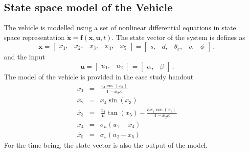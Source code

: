 \subsection*{State space model of the Vehicle}
The vehicle is modelled using a set of nonlinear differential equations in state space representation $\mathbf{\dot{x}} = \mathbf{f}(\mathbf{x}, \mathbf{u}, t)$.
The state vector of the system is defines as
\begin{equation}
	\mathbf{x} = \begin{bmatrix}
		x_1, &x_2, &x_3, &x_4, &x_5
	\end{bmatrix} = \begin{bmatrix}
		s, &d, &\theta_e, &v, &\phi
	\end{bmatrix}\, ,
\end{equation}
and the input
\begin{equation}
	\mathbf{u} = \begin{bmatrix}
		u_1, &u_2	
	\end{bmatrix} = \begin{bmatrix}
		\alpha, &\beta
	\end{bmatrix}\, .
\end{equation}
The model of the vehicle is provided in the case study handout
\begin{eqnarray}
	\dot{x_1} &=& \frac{x_4 \cos(x_3)}{1 - x_2\kappa}\label{eq:ss1}\\
	\dot{x_2} &=& x_4 \sin(x_3)\label{eq:ss2}\\
	\dot{x_3} &=& \frac{x_4}{L}\tan(x_5) - \frac{\kappa x_4 \cos(x_3)}{1 - x_2 \kappa}\label{eq:ss3}\\
	\dot{x_4} &=& \sigma_a (u_1 - x_4)\label{eq:ss4}\\
	\dot{x_5} &=& \sigma_s (u_2 - x_5)\label{eq:ss5}
\end{eqnarray}
For the time being, the state vector is also the output of the model.
